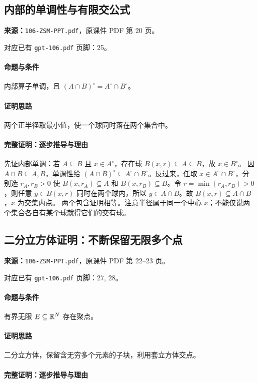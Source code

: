 \clearpage\subsection{内部的单调性与有限交公式}
\textbf{来源：}\texttt{106-ZSM-PPT.pdf}，原课件 PDF 第 20 页。\par
对应已有 \texttt{gpt-106.pdf} 页脚：25。\par
\paragraph{命题与条件}内部算子单调，且 $(A\cap B)^\circ=A^\circ\cap B^\circ$。
\paragraph{证明思路}两个正半径取最小值，使一个球同时落在两个集合中。
\paragraph{完整证明：逐步推导与理由}

先证内部单调：若 $A\subseteq B$ 且 $x\in A^\circ$，存在球 $B(x,r)\subseteq A\subseteq B$，故 $x\in B^\circ$。
因 $A\cap B\subseteq A,B$，单调性给 $(A\cap B)^\circ\subseteq A^\circ\cap B^\circ$。反过来，任取 $x\in A^\circ\cap B^\circ$，分别选 $r_A,r_B>0$ 使 $B(x,r_A)\subseteq A$ 和 $B(x,r_B)\subseteq B$。令 $r=\min(r_A,r_B)>0$，则任意 $y\in B(x,r)$ 同时在两个球内，所以 $y\in A\cap B$。故 $B(x,r)\subseteq A\cap B$，$x$ 为交集内点。
两个包含证明相等。注意半径属于同一个中心 $x$；不能仅说两个集合各自有某个球就得它们的交有球。

\clearpage\subsection{二分立方体证明：不断保留无限多个点}
\textbf{来源：}\texttt{106-ZSM-PPT.pdf}，原课件 PDF 第 22--23 页。\par
对应已有 \texttt{gpt-106.pdf} 页脚：27, 28。\par
\paragraph{命题与条件}有界无限 $E\subseteq\mathbb{R}^N$ 存在聚点。
\paragraph{证明思路}二分立方体，保留含无穷多个元素的子块，利用套立方体交点。
\paragraph{完整证明：逐步推导与理由}

